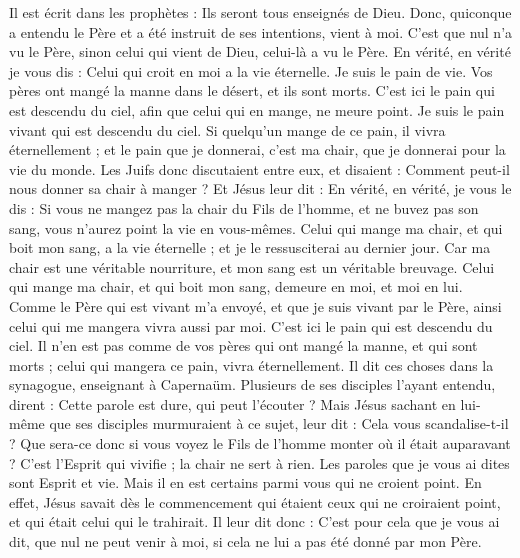 \begin{multicols}{2}
Il est écrit dans les prophètes : Ils seront tous enseignés de Dieu. Donc, quiconque a entendu le Père et a été instruit de ses intentions, vient à moi.
C'est que nul n'a vu le Père, sinon celui qui vient de Dieu, celui-là a vu le Père.
En vérité, en vérité je vous dis : Celui qui croit en moi a la vie éternelle.
Je suis le pain de vie.
Vos pères ont mangé la manne dans le désert, et ils sont morts.
C'est ici le pain qui est descendu du ciel, afin que celui qui en mange, ne meure point.
Je suis le pain vivant qui est descendu du ciel. Si quelqu'un mange de ce pain, il vivra éternellement ; et le pain que je donnerai, c'est ma chair, que je donnerai pour la vie du monde.
Les Juifs donc discutaient entre eux, et disaient : Comment peut-il nous donner sa chair à manger ?
Et Jésus leur dit : En vérité, en vérité, je vous le dis : Si vous ne mangez pas la chair du Fils de l'homme, et ne buvez pas son sang, vous n'aurez point la vie en vous-mêmes.
Celui qui mange ma chair, et qui boit mon sang, a la vie éternelle ; et je le ressusciterai au dernier jour.
Car ma chair est une véritable nourriture, et mon sang est un véritable breuvage.
Celui qui mange ma chair, et qui boit mon sang, demeure en moi, et moi en lui.
Comme le Père qui est vivant m'a envoyé, et que je suis vivant par le Père, ainsi celui qui me mangera vivra aussi par moi.
C'est ici le pain qui est descendu du ciel. Il n'en est pas comme de vos pères qui ont mangé la manne, et qui sont morts ; celui qui mangera ce pain, vivra éternellement.
Il dit ces choses dans la synagogue, enseignant à Capernaüm.
Plusieurs de ses disciples l'ayant entendu, dirent : Cette parole est dure, qui peut l'écouter ?
Mais Jésus sachant en lui-même que ses disciples murmuraient à ce sujet, leur dit : Cela vous scandalise-t-il ?
Que sera-ce donc si vous voyez le Fils de l'homme monter où il était auparavant ?
C'est l'Esprit qui vivifie ; la chair ne sert à rien. Les paroles que je vous ai dites sont Esprit et vie.
Mais il en est certains parmi vous qui ne croient point. En effet, Jésus savait dès le commencement qui étaient ceux qui ne croiraient point, et qui était celui qui le trahirait.
Il leur dit donc : C'est pour cela que je vous ai dit, que nul ne peut venir à moi, si cela ne lui a pas été donné par mon Père.

\end{multicols}
